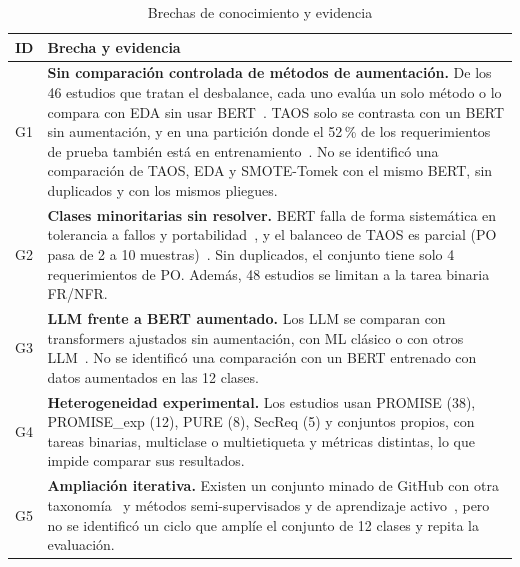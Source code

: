 \documentclass[conference]{IEEEtran}
\begin{document}
\begin{table}[!htbp]
\caption{Brechas de conocimiento y evidencia}
\label{tab:brechas}
\centering\footnotesize
\begin{tabularx}{\columnwidth}{@{}p{0.55cm} Y@{}}
\toprule
\textbf{ID} & \textbf{Brecha y evidencia} \\
\midrule
G1 & \textbf{Sin comparación controlada de métodos de aumentación.} De los 46 estudios que tratan el desbalance, cada uno evalúa un solo método o lo compara con EDA sin usar BERT~\cite{Sabir2022-Custom}. TAOS solo se contrasta con un BERT sin aumentación, y en una partición donde el 52\,\% de los requerimientos de prueba también está en entrenamiento~\cite{BenAmmar2025-TAOS}. No se identificó una comparación de TAOS, EDA y SMOTE-Tomek con el mismo BERT, sin duplicados y con los mismos pliegues. \\
G2 & \textbf{Clases minoritarias sin resolver.} BERT falla de forma sistemática en tolerancia a fallos y portabilidad~\cite{Ayed2025-Benchmarking}, y el balanceo de TAOS es parcial (PO pasa de 2 a 10 muestras)~\cite{BenAmmar2025-TAOS}. Sin duplicados, el conjunto tiene solo 4 requerimientos de PO. Además, 48 estudios se limitan a la tarea binaria FR/NFR. \\
G3 & \textbf{LLM frente a BERT aumentado.} Los LLM se comparan con transformers ajustados sin aumentación, con ML clásico o con otros LLM~\cite{Binkhonain2025-Prompts,Shafikuzzaman2025-Effectiveness,Wang2026-Machine,Kamal2025-Robust}. No se identificó una comparación con un BERT entrenado con datos aumentados en las 12 clases. \\
G4 & \textbf{Heterogeneidad experimental.} Los estudios usan PROMISE (38), PROMISE\_exp (12), PURE (8), SecReq (5) y conjuntos propios, con tareas binarias, multiclase o multietiqueta y métricas distintas, lo que impide comparar sus resultados. \\
G5 & \textbf{Ampliación iterativa.} Existen un conjunto minado de GitHub con otra taxonomía~\cite{Kamal2026-GitReq} y métodos semi-supervisados y de aprendizaje activo~\cite{Deocadez2017-Automatically,Zhang2022-Reducing,Alhoshan2026-SeqFAL}, pero no se identificó un ciclo que amplíe el conjunto de 12 clases y repita la evaluación. \\
\bottomrule
\end{tabularx}
\end{table}
\end{document}
